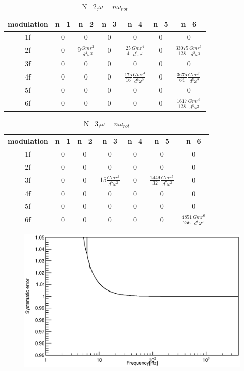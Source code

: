 \documentclass[]{spie}  %
\begin{document}
\begin{table}
\begin{center}
\caption{N=2,$\omega=n\omega_{rot}$ \label{pcal}}
\footnotesize
\begin{tabular}{ccccccc}
\hline
modulation& n=1 & n=2& n=3 &n=4&n=5&n=6 \\
\hline
1f&0&0&0&0&0&0 \\
2f&0&$9 \frac{Gmr^2}{d^4\omega^2}$&0&$\frac{25}{4} \frac{Gmr^4}{d^6\omega^2}$&0&$\frac{33075}{128} \frac{Gmr^6}{d^8\omega^2}$  \\
3f&0&0&0&0&0&0\\
4f&0&0&0&$\frac{175}{16} \frac{Gmr^4}{d^6\omega^2}$&0& $\frac{3675}{64} \frac{Gmr^6}{d^8\omega^2}$ \\
5f&0&0&0&0&0&0 \\
6f&0&0&0&0&0&$\frac{1617}{128} \frac{Gmr^6}{d^8\omega^2}$  \\
\hline
\end{tabular}
\end{center}
\end{table}

\begin{table}
\begin{center}
\caption{N=3,$\omega=n\omega_{rot}$ \label{pcal}}
\footnotesize
\begin{tabular}{ccccccc}
\hline
modulation& n=1 & n=2& n=3 &n=4&n=5&n=6 \\
\hline
1f&0&0&0&0&0&0 \\
2f&0&0&0&0&0&0  \\
3f&0&0&$15\frac{Gmr^3}{d^5\omega^2}$&0&$\frac{1449}{32}\frac{Gmr^5}{d^7\omega^2}$&0\\
4f&0&0&0&0&0&0 \\
5f&0&0&0&0&0&0 \\
6f&0&0&0&0&0&$\frac{4851}{256} \frac{Gmr^6}{d^8\omega^2}$  \\
\hline
\end{tabular}
\end{center}
\end{table}

\begin{figure}
\begin{center}
\includegraphics[width=12cm]{dx_Gcal_ratio.eps}
\caption{}
\label{fig:ratio}
\end{center}
\end{figure}
\end{document}
